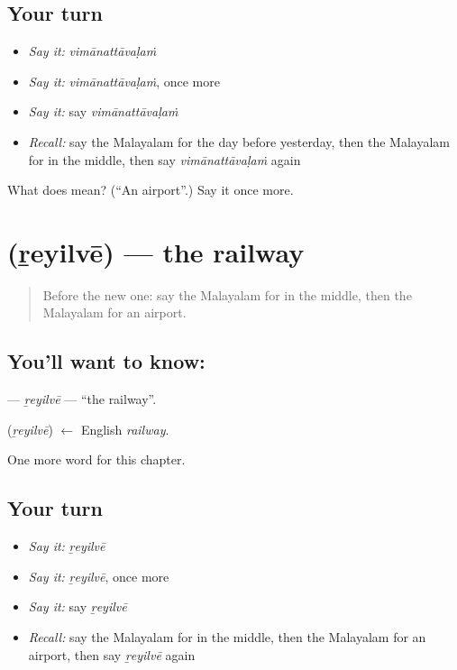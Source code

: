 \subsection*{Your turn}
\begin{itemize}
\raggedright
  \item \emph{Say it:} \emph{vimānattāvaḷaṁ}
  \item \emph{Say it:} \emph{vimānattāvaḷaṁ}, once more
  \item \emph{Say it:} say \emph{vimānattāvaḷaṁ}
  \item \emph{Recall:} say the Malayalam for the day before yesterday, then the Malayalam for in the middle, then say \emph{vimānattāvaḷaṁ} again
\end{itemize}

\begin{tcolorbox}[breakable,colback=teal!4,colframe=teal!35!black,title={Before you move on}]
What does  mean? (\textquotedblleft{}An airport\textquotedblright{}.) Say it once more.
\end{tcolorbox}
\section[\texorpdfstring{\ml{റെയിൽവേ} (ṟeyilvē)}{റെയിൽവേ (ṟeyilvē)}]{ (ṟeyilvē) — the railway}

\label{lesson:ML-C238-reyilve}



\begin{quote}
Before the new one: say the Malayalam for in the middle, then the Malayalam for an airport.
\end{quote}

\subsection*{You'll want to know: }
\textbf{} — \emph{ṟeyilvē} — \textquotedblleft{}the railway\textquotedblright{}.

\begin{cousinweb}
\textbf{} (\emph{ṟeyilvē}) $\leftarrow$ English \emph{railway}.
\end{cousinweb}

\begin{grammarlens}[title={What you've built}]
One more word for this chapter.
\end{grammarlens}

\subsection*{Your turn}
\begin{itemize}
\raggedright
  \item \emph{Say it:} \emph{ṟeyilvē}
  \item \emph{Say it:} \emph{ṟeyilvē}, once more
  \item \emph{Say it:} say \emph{ṟeyilvē}
  \item \emph{Recall:} say the Malayalam for in the middle, then the Malayalam for an airport, then say \emph{ṟeyilvē} again
\end{itemize}

